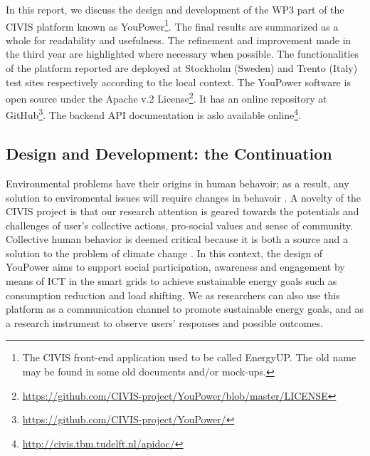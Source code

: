 In this report, we discuss the design and development of the WP3 part of the CIVIS platform known as YouPower\footnote{The CIVIS front-end application used to be called EnergyUP. The old name may be found in some old documents and/or mock-ups.}. 
The final results are summarized as a whole for readability and usefulness. The refinement and improvement made in the third year are highlighted where necessary when possible. 
% 
The functionalities of the platform reported are deployed at Stockholm (Sweden) and Trento (Italy) test sites respectively according to the local context. The YouPower software is open source under the Apache v.2 License\footnote{\url{https://github.com/CIVIS-project/YouPower/blob/master/LICENSE}}. It has  an online repository at GitHub\footnote{ \url{https://github.com/CIVIS-project/YouPower/}}. 
The backend API documentation is aslo available online\footnote{ \url{http://civis.tbm.tudelft.nl/apidoc/}}. 


\subsection{Design and Development: the Continuation}

Environmental problems have their origins in human behavoir; as a result, any solution to enviromental issues will require changes in behavoir 
\citep{Schultz2014}.
A novelty of the CIVIS project is that our research attention is geared towards the potentials and challenges of user's collective actions, pro-social values and sense of community. 
Collective human behavior is deemed critical because it is both a source and a solution to the problem of climate change \citep{Masson2014}.
In this context, the design of YouPower aims to support social participation, awareness and engagement by means of ICT in the smart grids to achieve sustainable energy goals such as consumption reduction and load shifting. We as researchers can also use this platform as a communication channel to promote sustainable energy goals, and as a research instrument to observe users' responses and possible outcomes. 




